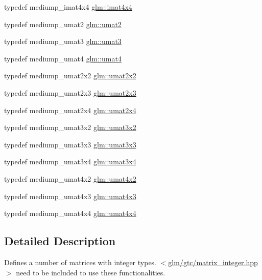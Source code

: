 \begin{DoxyCompactItemize}
typedef mediump\-\_\-imat4x4 \hyperlink{group__gtc__matrix__integer_ga367d8d5281ff82f1215a227dd2ea5ba9}{glm\-::imat4x4}
\item 
typedef mediump\-\_\-umat2 \hyperlink{group__gtc__matrix__integer_gae2d45c058cfa0b60ab4df0cdda2d8516}{glm\-::umat2}
\item 
typedef mediump\-\_\-umat3 \hyperlink{group__gtc__matrix__integer_ga8b8fbc858e28abf8fc344744f8d6d368}{glm\-::umat3}
\item 
typedef mediump\-\_\-umat4 \hyperlink{group__gtc__matrix__integer_ga7ae562000d8a8d193e9f93cf51e2e113}{glm\-::umat4}
\item 
typedef mediump\-\_\-umat2x2 \hyperlink{group__gtc__matrix__integer_gad3c997b31dd69bdb4787867e758ed48d}{glm\-::umat2x2}
\item 
typedef mediump\-\_\-umat2x3 \hyperlink{group__gtc__matrix__integer_ga890ae28f9230794138b2c89f44ce3376}{glm\-::umat2x3}
\item 
typedef mediump\-\_\-umat2x4 \hyperlink{group__gtc__matrix__integer_ga3b23b164240cf4dfb429776da7be9d88}{glm\-::umat2x4}
\item 
typedef mediump\-\_\-umat3x2 \hyperlink{group__gtc__matrix__integer_ga257300f2710612877ef45438a366e308}{glm\-::umat3x2}
\item 
typedef mediump\-\_\-umat3x3 \hyperlink{group__gtc__matrix__integer_gab80b6501ba1b2c40119a0f2d256f4c97}{glm\-::umat3x3}
\item 
typedef mediump\-\_\-umat3x4 \hyperlink{group__gtc__matrix__integer_ga5410857d098a989a30b4017100bc2ff7}{glm\-::umat3x4}
\item 
typedef mediump\-\_\-umat4x2 \hyperlink{group__gtc__matrix__integer_ga13e8392218e9b6e1b7f194a21b5c88bf}{glm\-::umat4x2}
\item 
typedef mediump\-\_\-umat4x3 \hyperlink{group__gtc__matrix__integer_ga08373f5588a54da1a48e5e55c7d51004}{glm\-::umat4x3}
\item 
typedef mediump\-\_\-umat4x4 \hyperlink{group__gtc__matrix__integer_gae0931b79e808fb0983848778a60eb548}{glm\-::umat4x4}
\end{DoxyCompactItemize}


\subsection{Detailed Description}
Defines a number of matrices with integer types. $<$\hyperlink{matrix__integer_8hpp}{glm/gtc/matrix\-\_\-integer.\-hpp}$>$ need to be included to use these functionalities. 

